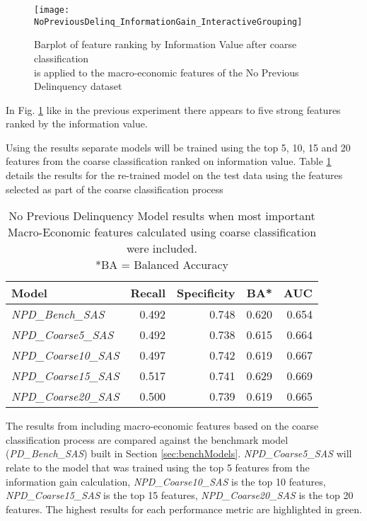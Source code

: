 \begin{figure}[H]
	\texttt{[image: NoPreviousDelinq\_InformationGain\_InteractiveGrouping]}
	\caption{Barplot of feature ranking by Information Value after coarse classification \\is applied to the macro-economic features of the No Previous Delinquency dataset}
	\label{fig:Information Value using SAS No Previous Delinquency Features}
\end{figure}

In Fig. \ref{fig:Information Value using SAS No Previous Delinquency Features} like in the previous experiment there appears to five strong features ranked by the information value. 

Using the results separate models will be trained using the top 5, 10, 15 and 20 features from
the coarse classification ranked on information value. Table \ref{table:CoarseNPDModelResults} details the results for the re-trained model
on the test data using the features selected as part of the coarse classification process

\begin{table}[H]
	\centering
	\small
	\begin{tabular}{l r r r r}
		\hline
		\textbf{Model} & \textbf{Recall} & \textbf{Specificity} & \textbf{BA*} & \textbf{AUC}  \\ \hline
		\textit{NPD\_Bench\_SAS} & 0.492 & \cellcolor{green!25}0.748 & 0.620 & 0.654 \\ \hline
		\textit{NPD\_Coarse5\_SAS}  & 0.492 & 0.738 & 0.615 & 0.664   \\ 
		\textit{NPD\_Coarse10\_SAS} & 0.497 & 0.742 & 0.619 & 0.667  \\ 
		\textit{NPD\_Coarse15\_SAS} & \cellcolor{green!25}0.517 & 0.741 & \cellcolor{green!25}0.629 & \cellcolor{green!25}0.669  \\
		\textit{NPD\_Coarse20\_SAS} & 0.500 & 0.739 & 0.619 & 0.665  \\\hline 
	\end{tabular}
	\caption{{No Previous Delinquency Model results when most important\\
			Macro-Economic features calculated using coarse classification were included.
			\\ *BA = Balanced Accuracy}}
	\label{table:CoarseNPDModelResults}
\end{table}
The results from including macro-economic features based on the coarse classification process are compared against the benchmark model (\textit{PD\_Bench\_SAS}) built in Section \ref{sec:benchModels}. \textit{NPD\_Coarse5\_SAS} will relate to the model that was trained using the top 5 features from the information gain calculation, \textit{NPD\_Coarse10\_SAS} is the top 10 features, \textit{NPD\_Coarse15\_SAS} is the top 15 features, \textit{NPD\_Coarse20\_SAS} is the top 20 features. The highest results for each performance metric are highlighted in green.

